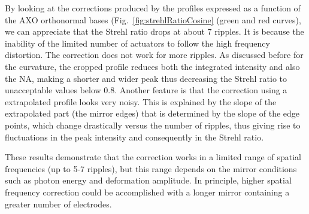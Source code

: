 \documentclass{iucr}
\newcommand{\inblue}[1]{{\color{black}#1}}
\begin{document}
By looking at the corrections produced by the profiles expressed as a function of the AXO orthonormal bases (Fig.~\ref{fig:strehlRatioCosine} (green and red curves), we can appreciate that the Strehl ratio drops at about 7 ripples. It is because the inability of the limited number of actuators to follow the high frequency distortion. The correction does not work for more ripples. As discussed before for the curvature, the cropped profile reduces both the integrated intensity and also the NA, making a shorter and wider peak thus decreasing the Strehl ratio to unacceptable values below 0.8.
Another feature is that the correction using a extrapolated profile looks very noisy. This is explained by the slope of the extrapolated part (the mirror edges) that is determined by the slope of the edge points, which change drastically versus the number of ripples, thus giving rise to fluctuations in the peak intensity and consequently in the Strehl ratio.


\inblue{These results demonstrate that the correction works in a limited range of spatial frequencies (up to 5-7 ripples), but this range depends on the mirror conditions such as photon energy and deformation amplitude. 
In principle, higher spatial frequency correction could be accomplished with a longer mirror containing a greater number of electrodes.}
 
\end{document}
